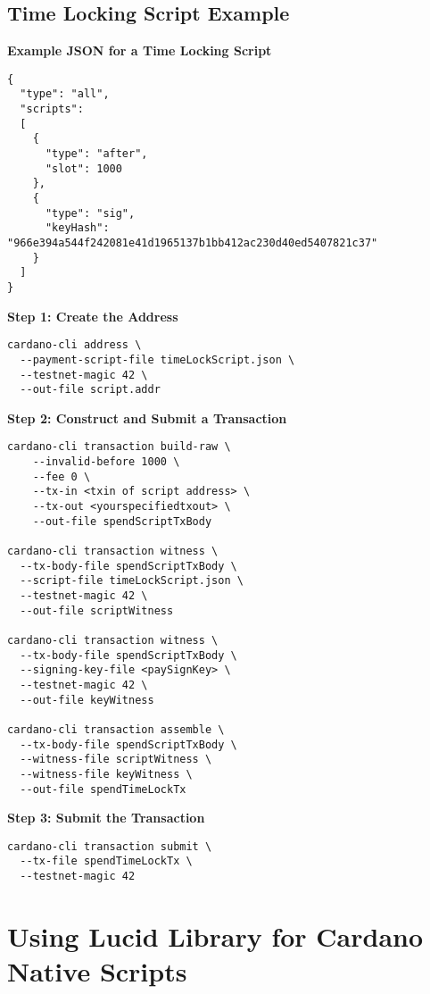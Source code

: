 \subsection{Time Locking Script Example}

\textbf{Example JSON for a Time Locking Script}

\begin{lstlisting}
{
  "type": "all",
  "scripts":
  [
    {
      "type": "after",
      "slot": 1000
    },
    {
      "type": "sig",
      "keyHash": "966e394a544f242081e41d1965137b1bb412ac230d40ed5407821c37"
    }
  ]
}
\end{lstlisting}

\textbf{Step 1: Create the Address}

\begin{verbatim}
cardano-cli address \
  --payment-script-file timeLockScript.json \
  --testnet-magic 42 \
  --out-file script.addr
\end{verbatim}

\textbf{Step 2: Construct and Submit a Transaction}

\begin{verbatim}
cardano-cli transaction build-raw \
    --invalid-before 1000 \
    --fee 0 \
    --tx-in <txin of script address> \
    --tx-out <yourspecifiedtxout> \
    --out-file spendScriptTxBody

cardano-cli transaction witness \
  --tx-body-file spendScriptTxBody \
  --script-file timeLockScript.json \
  --testnet-magic 42 \
  --out-file scriptWitness

cardano-cli transaction witness \
  --tx-body-file spendScriptTxBody \
  --signing-key-file <paySignKey> \
  --testnet-magic 42 \
  --out-file keyWitness

cardano-cli transaction assemble \
  --tx-body-file spendScriptTxBody \
  --witness-file scriptWitness \
  --witness-file keyWitness \
  --out-file spendTimeLockTx
\end{verbatim}

\textbf{Step 3: Submit the Transaction}

\begin{verbatim}
cardano-cli transaction submit \
  --tx-file spendTimeLockTx \
  --testnet-magic 42
\end{verbatim}

\section{Using Lucid Library for Cardano Native Scripts}

